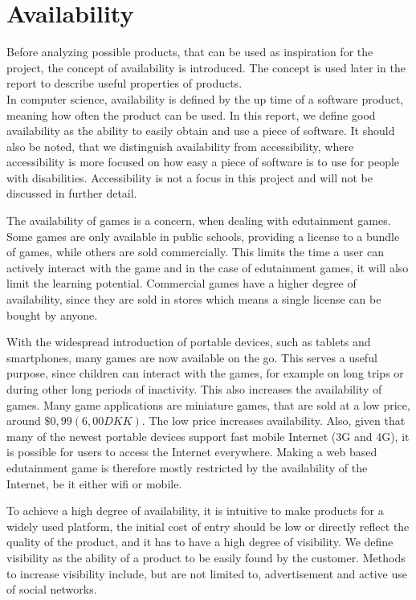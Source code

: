 \section{Availability}
\label{sec:availability}
Before analyzing possible products, that can be used as inspiration for the project, the concept of availability is introduced. The concept is used later in the report to describe useful properties of products.\\ 

In computer science, availability is defined by the up time of a software product, meaning how often the product can be used.\cite{defAvailability}
In this report, we define good availability as the ability to easily obtain and use a piece of software.
It should also be noted, that we distinguish availability from accessibility, where accessibility is more focused on how easy a piece of software is to use for people with disabilities.
Accessibility is not a focus in this project and will not be discussed in further detail.\newline

The availability of games is a concern, when dealing with edutainment games.
Some games are only available in public schools, providing a license to a bundle of games, while others are sold commercially.
This limits the time a user can actively interact with the game and in the case of edutainment games, it will also limit the learning potential.
Commercial games have a higher degree of availability, since they are sold in stores which means a single license can be bought by anyone.\newline

With the widespread introduction of portable devices, such as tablets and smartphones, many games are now available on the go.
This serves a useful purpose, since children can interact with the games, for example on long trips or during other long periods of inactivity.
This also increases the availability of games.
Many game applications are miniature games, that are sold at a low price, around $\$0,99 (6,00 DKK)$.
The low price increases availability.
Also, given that many of the newest portable devices support fast mobile Internet (3G and 4G), it is possible for users to access the Internet everywhere.
Making a web based edutainment game is therefore mostly restricted by the availability of the Internet, be it either wifi or mobile.\newline

To achieve a high degree of availability, it is intuitive to make products for a widely used platform, the initial cost of entry should be low or directly reflect the quality of the product, and it has to have a high degree of visibility.
We define visibility as the ability of a product to be easily found by the customer.
Methods to increase visibility include, but are not limited to, advertisement and active use of social networks.